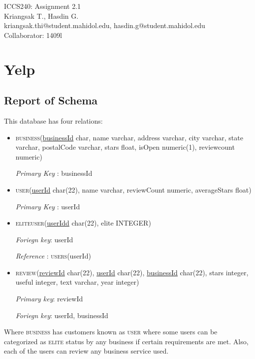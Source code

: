 \documentclass[a4paper, 11pt]{article}
\makeatletter
\newcommand{\myname}{Kriangsak T., Hasdin G.}
\newcommand{\myemail}{kriangsak.thi@student.mahidol.edu, hasdin.g@student.mahidol.edu}
\newcommand{\myhwnum}{2.1}
\makeatother
\begin{document}
\medskip                        %

\thispagestyle{plain}
\begin{center}                  %
{\Large ICCS240: Assignment \myhwnum} \\
\myname \\
\myemail \\
Collaborator: {1409l}
\end{center}
\section{Yelp}
\subsection{Report of Schema}
	This database has four relations:  
	\begin{itemize}
	\item \textsc{business}(\underline{businessId} char,
	name varchar,
	address varchar,
	city varchar,
	state varchar,
	postalCode varchar,
	stars float,
	isOpen numeric(1),
	reviewcount numeric)
	
	\textit{Primary Key} : businessId
	\item \textsc{user}(\underline{userId} char(22), 
	name varchar,
	 reviewCount numeric, 
	 averageStars float)
	 
	 \textit{Primary Key} : userId
	 
	 \item \textsc{eliteuser}(\underline{userIdd} char(22), elite INTEGER)
	 
	 \textit{Foriegn key}: userId
	 
	 \textit{Reference} : \textsc{users}(userId)
	 
	\item \textsc{review}(\underline{reviewId} char(22),
\underline{userId} char(22),
\underline{businessId} char(22),
stars integer,
 useful integer,
text varchar,
year integer) 

	 \textit{Primary key}: reviewId
	 
	  \textit{Foriegn key}: userId, businessId
	  
	\end{itemize}
	
		Where \textsc{business} has customers known as \textsc{user} where some users can be categorized as \textsc{elite} status by any business if certain requirements are met. Also, each of the users can review any business service used.
\end{document}
